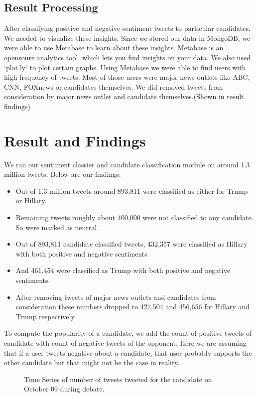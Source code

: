 \documentclass{acm_proc_article-sp}
\begin{document}
\subsection{Result Processing}
After classifying positive and negative sentiment tweets to particular candidates. We needed to visualize these insights. Since we stored our data in MongoDB, we were able to use Metabase to learn about these insights. Metabase is an opensoure analytics tool, which lets you find insights on your data.\cite{metabase:mbdb} We also used `plot.ly` to plot certain graphs. \cite{plotly:graphplot}
Using Metabase we were able to find users with high frequency of tweets. Most of those users were major news outlets like ABC, CNN, FOXnews or candidates themselves. We did removed tweets from consideration by major news outlet and candidate themselves.(Shown in result findings)  

\section{Result and Findings}
We ran our sentiment classier and candidate classification module on around 1.3 million tweets. Below are our findings:
\begin{itemize}
	\item Out of 1.3 million tweets around 893,811 were classified as either for Trump or Hillary. 
	\item Remaining tweets roughly about 400,000 were not classified to any candidate. So were marked as neutral.
	\item Out of 893,811 candidate classified tweets, 432,357 were classified as Hillary with both positive and negative sentiments
	\item And 461,454 were classified as Trump with both positive and negative sentiments.
	\item After removing tweets of major news outlets and candidates from consideration these numbers dropped to 427,504 and 456,656 for Hillary and Trump respectively.
\end{itemize}
To compute the popularity of a candidate, we add the count of positive tweets of candidate with count of negative tweets of the opponent. Here we are assuming that if a user tweets negative about a candidate, that user probably supports the other candidate but that might not be the case in reality.

\begin{figure*}
	\centering
	\caption{Time Series of number of tweets tweeted for the candidate on October 09 during debate.}
\end{figure*}
\end{document}
